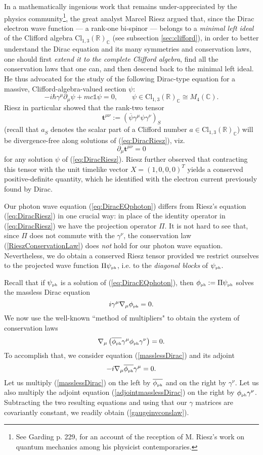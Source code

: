 \documentclass[12pt]{article}
\theoremstyle{definition}
\newcommand{\refeq}[1]{(\ref{#1})}
\numberwithin{equation}{section}
\newcommand{\bt}{\mathbf{t}}
\newcommand{\beq}{\begin{equation}}
\newcommand{\eeq}{\end{equation}}
\newcommand{\Id}{\mathds{1}}
\newcommand{\p}{\partial}
\newcommand{\psiPH}{{\psi_{\mbox{\rm\tiny ph}}}}
\newcommand{\phiPH}{{\phi_{\mbox{\rm\tiny ph}}}}
\newcommand{\Cset}{{\mathbb C}}
\newcommand{\Rset}{{\mathbb R}}
\newcommand{\ga}{\gamma}
\newcommand{\nab}{\nabla}
\begin{document}
In a mathematically ingenious work \cite{Rie1946} that remains under-appreciated by the physics community\footnote{See 
  Garding \cite{GardingHISTORY} p. 229,  for an account of the reception of M. Riesz's work on quantum mechanics among 
  his physicist contemporaries.}, 
the great analyst Marcel Riesz argued that, since the Dirac electron wave function --- a rank-one bi-spinor --- belongs to 
a {\em minimal left ideal} of the Clifford algebra $\mbox{Cl}_{1,3}(\Rset)_\Cset$ (see subsection \ref{sec:clifford}), in order to better understand the Dirac equation 
and its many symmetries and conservation laws, one should first {\em extend it to the complete Clifford algebra}, find all the 
conservation laws that one can, and then descend back to the minimal left ideal. 
 He thus advocated for the study of the following Dirac-type equation for a massive, Clifford-algebra-valued section $\psi$:
\beq\label{eq:DiracRiesz}
-i\hbar \ga^\mu \p_\mu \psi + m c \Id \psi = 0,\qquad \psi \in \mbox{Cl}_{1,3}(\Rset)_\Cset \cong M_4(\Cset).
\eeq
 Riesz in particular showed that the rank-two tensor 
\beq\label{RieszTENSORdef}
\bt^{\mu\nu} := (\overline{\psi} \ga^\mu\psi\ga^\nu)_S^{}
\eeq
 (recall that $a_S^{}$ denotes the scalar part of a Clifford number $a\in \mbox{Cl}_{1,3}(\Rset)_\Cset$)  
will be divergence-free along solutions of \refeq{eq:DiracRiesz}, viz.
\beq\label{RieszConservationLaw}
\p_\mu \bt^{\mu\nu} = 0
\eeq 
for any solution $\psi$ of \refeq{eq:DiracRiesz}.
 Riesz further observed that contracting this tensor with the unit timelike vector $X = (1,0,0,0)^T$ yields a conserved 
positive-definite quantity, which he identified with the electron current previously found by Dirac.  

 Our photon wave equation \refeq{eq:DiracEQphoton} differs from Riesz's equation \refeq{eq:DiracRiesz} in one crucial way:
in place of the identity operator in \refeq{eq:DiracRiesz} we have the projection operator $\Pi$.
  It is not hard to see that, since $\Pi$ does not commute with the $\ga^\nu$, the conservation law 
\refeq{RieszConservationLaw} does {\em not} hold for our photon wave equation. 
 Nevertheless, we do obtain a conserved Riesz tensor provided we restrict ourselves to the projected wave function $\Pi\psiPH$, 
i.e. to the {\em diagonal blocks} of $\psiPH$.

 Recall that if $\psiPH$ is a solution of \refeq{eq:DiracEQphoton}, then $\phiPH :=\Pi\psiPH$ solves the massless Dirac equation
\beq \label{masslessDirac}
i\ga^\mu \nab_\mu \phiPH = 0.
\eeq
We now use the well-known ``method of multipliers" to obtain the system of conservation laws
\beq \label{gaugeinvconslaw}
\nab_\mu \left( \overline{\phiPH} \ga^\mu \phiPH \ga^\nu\right) = 0.
\eeq
 To accomplish that, we consider equation \refeq{masslessDirac} and its adjoint
\beq \label{adjointmasslessDirac}
-i \nab_\mu \overline{\phiPH} \ga^\mu = 0.
\eeq
 Let us multiply \refeq{masslessDirac} on the left by $\overline{\phiPH}$ and on the right by $\ga^\nu$. 
 Let us also multiply the adjoint equation \refeq{adjointmasslessDirac} on the right by $\phiPH \ga^\nu$.
  Subtracting the two resulting equations and using that our $\gamma$ matrices are covariantly constant, 
we readily obtain \refeq{gaugeinvconslaw}.
\end{document}
